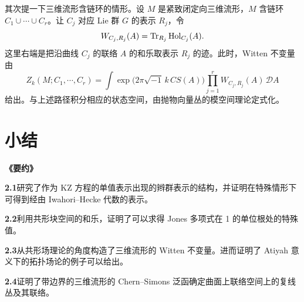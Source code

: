 
其次提一下三维流形含链环的情形。设 $M$ 是紧致闭定向三维流形，$M$ 含链环 $C_1\cup\cdots\cup C_r$。让 $C_j$ 对应 Lie 群 $G$ 的表示 $R_j$，令
\begin{equation*}
  W_{C_j,R_j}(A)=\operatorname{Tr}_{R_j}\mathrm{Hol}_{C_j}(A).
\end{equation*}
这里右端是把沿曲线 $C_j$ 的联络 $A$ 的和乐取表示 $R_j$ 的迹。此时，Witten 不变量由
\begin{equation}
  Z_k(M;C_1,\cdots,C_r)=\int\exp\bigl(2\pi\sqrt{-1}\,k\,CS(A)\bigr)\prod_{j=1}^{r}W_{C_j,R_j}(A)\,\mathcal{D}A \tag{2.41}
\end{equation}
给出。与上述路径积分相应的状态空间，由抛物向量丛的模空间理论定式化。



\section*{小结}


\textbf{《要约》}

\textbf{2.1}\quad 研究了作为 KZ 方程的单值表示出现的辫群表示的结构，并证明在特殊情形下可得到经由 Iwahori--Hecke 代数的表示。

\textbf{2.2}\quad 利用共形块空间的和乐，证明了可以求得 Jones 多项式在 1 的单位根处的特殊值。

\textbf{2.3}\quad 从共形场理论的角度构造了三维流形的 Witten 不变量。进而证明了 Atiyah 意义下的拓扑场论的例子可以给出。

\textbf{2.4}\quad 证明了带边界的三维流形的 Chern--Simons 泛函确定曲面上联络空间上的复线丛及其联络。


